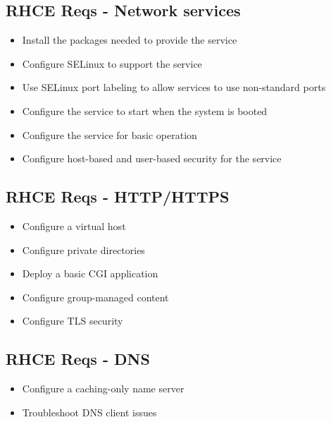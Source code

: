\documentclass[letterpaper,10pt,english]{sphinxmanual}
\begin{document}
\subsection{RHCE Reqs - Network services}
\label{rhce:rhce-reqs-network-services}\begin{itemize}
\item {} 
Install the packages needed to provide the service

\item {} 
Configure SELinux to support the service

\item {} 
Use SELinux port labeling to allow services to use non-standard ports

\item {} 
Configure the service to start when the system is booted

\item {} 
Configure the service for basic operation

\item {} 
Configure host-based and user-based security for the service

\end{itemize}


\subsection{RHCE Reqs - HTTP/HTTPS}
\label{rhce:rhce-reqs-http-https}\begin{itemize}
\item {} 
Configure a virtual host

\item {} 
Configure private directories

\item {} 
Deploy a basic CGI application

\item {} 
Configure group-managed content

\item {} 
Configure TLS security

\end{itemize}


\subsection{RHCE Reqs - DNS}
\label{rhce:rhce-reqs-dns}\begin{itemize}
\item {} 
Configure a caching-only name server

\item {} 
Troubleshoot DNS client issues

\end{itemize}
\end{document}
